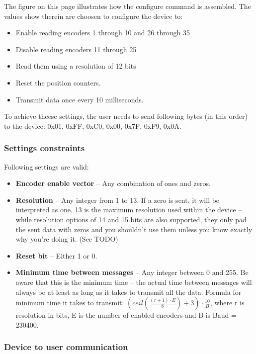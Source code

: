 \documentclass[twoside]{article}
\begin{document}
The figure on this page illustrates how the configure command is assembled. The values show therein are choosen to configure the device to:

\begin{itemize}
\item Enable reading encoders 1 through 10 and 26 through 35
\item Disable reading encoders 11 through 25
\item Read them using a resolution of 12 bits
\item Reset the position counters.
\item Transmit data once every 10 milliseconds.
\end{itemize}

To achieve theese settings, the user needs to send following bytes (in this order) to the device: 0x01, 0xFF, 0xC0, 0x00, 0x7F, 0xF9, 0x0A.

\subsubsection{Settings constraints}

Following settings are valid:

\begin{itemize}
\item \textbf{Encoder enable vector} -- Any combination of ones and zeros.
\item \textbf{Resolution} -- Any integer from 1 to 13. If a zero is sent, it will be interpreted as one. 13 is the maximum resolution used within the device -- while resolution options of 14 and 15 bits are also supported, they only pad the sent data with zeros and you shouldn't use them unless you know exactly why you're doing it. (See TODO)
\item \textbf{Reset bit} -- Either 1 or 0.
\item \textbf{Minimum time between messages} -- Any integer between 0 and 255. Be aware that this is the minimum time -- the actual time between messages will always be at least as long as it takes to transmit all the data. Formula for minimum time it takes to transmit: $(ceil(\frac{(r+1)\cdot{}E}{8}) + 3)\cdot{}\frac{10}{B}$, where r is resolution in bits, E is the number of enabled encoders and B is Baud = 230400.
\end{itemize}




\subsubsection{Device to user communication}
\end{document}
